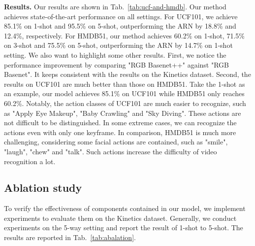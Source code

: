 \documentclass[sigconf]{acmart}
\begin{document}
	
	\noindent \textbf{Results.} 
	Our results are shown in Tab.~\ref{tab:ucf-and-hmdb}. 
	Our method achieves state-of-the-art performance on all settings. 
	For UCF101, we achieve 85.1\% on 1-shot and 95.5\% on 5-shot, outperforming the ARN \cite{zhang2020few} by 18.8\% and 12.4\%, respectively. 
	For HMDB51, our method achieves 60.2\% on 1-shot, 71.5\% on 3-shot and 75.5\% on 5-shot, outperforming the ARN \cite{zhang2020few} by 14.7\% on 1-shot setting. 
	We also want to highlight some other results. 
	First, we notice the performance improvement by comparing "RGB Basenet++" against "RGB Basenet". 
	It keeps consistent with the results on the Kinetics dataset. 
	Second, the results on UCF101 are much better than those on HMDB51. 
	Take the 1-shot as an example, our model achieves 85.1\% on UCF101 while HMDB51 only reaches 60.2\%.  
	Notably, the action classes of UCF101 are much easier to recognize, such as "Apply Eye Makeup", "Baby Crawling" and "Sky Diving". These actions are not difficult to be distinguished. In some extreme cases, we can recognize the actions even with only one keyframe. In comparison, HMDB51 is much more challenging, considering some facial actions are contained, such as "smile", "laugh", "chew" and "talk". Such actions increase the difficulty of video recognition a lot.
	
	
	
	
	
	
	\subsection{Ablation study}
	To verify the effectiveness of components contained in our model, we implement experiments to evaluate them on the Kinetics dataset. Generally, we conduct experiments on the 5-way setting and report the result of 1-shot to 5-shot. The results are reported in Tab.~\ref{tab:abalation}.
	
\end{document}
